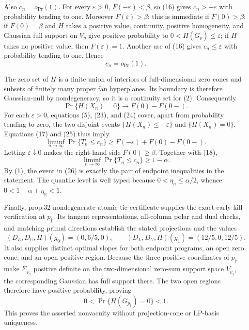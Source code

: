 Also \(c_n=o_{\Pr}(1)\).  For every \(\varepsilon>0\), \(F(-\varepsilon)<\beta\), so (16) gives \(c_n> -\varepsilon\) with probability tending to one.  Moreover \(F(\varepsilon)>\beta\): this is immediate if \(F(0)>\beta\); if \(F(0)=\beta\) and \(H\) takes a positive value, continuity, positive homogeneity, and Gaussian full support on \(V_p\) give positive probability to \(0<H(G_p)\leq\varepsilon\); if \(H\) takes no positive value, then \(F(\varepsilon)=1\).  Another use of (16) gives \(c_n\leq\varepsilon\) with probability tending to one.  Hence
\[
c_n=o_{\Pr}(1).
\tag{24}
\]

The zero set of \(H\) is a finite union of interiors of full-dimensional zero cones and subsets of finitely many proper fan hyperplanes.  Its boundary is therefore Gaussian-null by nondegeneracy, so it is a continuity set for (2).  Consequently
\[
\Pr\{H(X_n)=0\}\longrightarrow F(0)-F(0-).
\tag{25}
\]
For each \(\varepsilon>0\), equations (5), (23), and (24) cover, apart from probability tending to zero, the two disjoint events \(\{H(X_n)\leq-\varepsilon\}\) and \(\{H(X_n)=0\}\).  Equations (17) and (25) thus imply
\[
\liminf_{n\to\infty}\Pr\{T_n\leq c_n\}
\geq F(-\varepsilon)+F(0)-F(0-).
\]
Letting \(\varepsilon\downarrow0\) makes the right-hand side \(F(0)\geq\beta\).  Together with (18),
\[
\liminf_{n\to\infty}\Pr\{T_n\leq c_n\}\geq1-\alpha.
\tag{26}
\]
By (1), the event in (26) is exactly the pair of endpoint inequalities in the statement.  The quantile level is well typed because \(0<\eta_n\leq\alpha/2\), whence \(0<1-\alpha+\eta_n<1\).

Finally, \(\text{prop:32-nondegenerate-atomic-tie-certificate}\) supplies the exact early-kill verification at \(p_\dagger\).  Its tangent representations, all-column polar and dual checks, and matching primal directions establish the stated projections and the values
\[
(D_L,D_U,H)(g_0)=(0,6/5,0),
\qquad
(D_L,D_U,H)(g_1)=(12/5,0,12/5).
\]
It also supplies distinct optimal slopes for both endpoint programs, an open zero cone, and an open positive region.  Because the three positive coordinates of \(p_\dagger\) make \(\Sigma_{p_\dagger}\) positive definite on the two-dimensional zero-sum support space \(V_{p_\dagger}\), the corresponding Gaussian has full support there.  The two open regions therefore have positive probability, proving
\[
0<\Pr\{H(G_{p_\dagger})=0\}<1.
\]
This proves the asserted nonvacuity without projection-cone or LP-basis uniqueness.